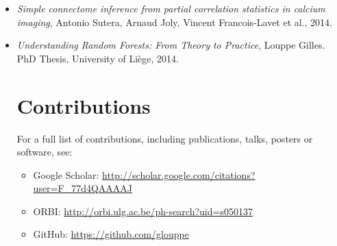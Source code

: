 \begin{itemize}
\item \citep{sutera:2014} \textit{Simple connectome inference from partial correlation statistics in calcium imaging},
Antonio Sutera, Arnaud Joly, Vincent Francois-Lavet et al., 2014.

\item \citep{louppe:2014phd} \textit{Understanding Random Forests: From Theory to Practice},
Louppe Gilles. PhD Thesis, University of Li{\`e}ge, 2014.

\section{Contributions}

For a full list of contributions, including publications, talks, posters or software,
see:

\begin{itemize}
\item Google Scholar: \url{http://scholar.google.com/citations?user=F_77d4QAAAAJ}
\item ORBI: \url{http://orbi.ulg.ac.be/ph-search?uid=s050137}
\item GitHub: \url{https://github.com/glouppe}
\end{itemize}

\pagebreak
\begingroup
    
    \renewcommand{\bibname}{}
    \label{app:bibliography}
    
\endgroup

\end{itemize}
